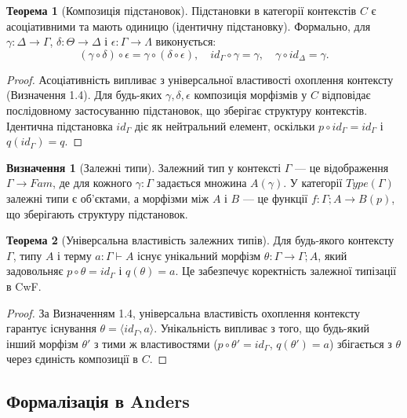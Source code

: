 \documentclass{article}
\theoremstyle{definition}
\newtheorem{definition}{Визначення}[section]
\newtheorem{theorem}{Теорема}[section]
\begin{document}
\begin{theorem}[Композиція підстановок]
Підстановки в категорії контекстів $C$ є асоціативними та мають одиницю (ідентичну підстановку). Формально, для $\gamma:\Delta\rightarrow\Gamma$, $\delta:\Theta\rightarrow\Delta$ і $\epsilon:\Gamma\rightarrow\Lambda$ виконується:
\[
    (\gamma \circ \delta) \circ \epsilon = \gamma \circ (\delta \circ \epsilon), \quad id_{\Gamma} \circ \gamma = \gamma, \quad \gamma \circ id_{\Delta} = \gamma.
\]
\end{theorem}

\begin{proof}
Асоціативність випливає з універсальної властивості охоплення контексту (Визначення 1.4). Для будь-яких $\gamma,\delta,\epsilon$ композиція морфізмів у $C$ відповідає послідовному застосуванню підстановок, що зберігає структуру контекстів. Ідентична підстановка $id_{\Gamma}$ діє як нейтральний елемент, оскільки $p \circ id_{\Gamma} = id_{\Gamma}$ і $q(id_{\Gamma}) = q$.
\end{proof}

\begin{definition}[Залежні типи]
Залежний тип у контексті $\Gamma$ --- це відображення $\Gamma \rightarrow Fam$, де для кожного $\gamma:\Gamma$ задається множина $A(\gamma)$. У категорії $Type(\Gamma)$ залежні типи є об’єктами, а морфізми між $A$ і $B$ --- це функції $f: \Gamma;A \rightarrow B(p)$, що зберігають структуру підстановок.
\end{definition}

\begin{theorem}[Універсальна властивість залежних типів]
Для будь-якого контексту $\Gamma$, типу $A$ і терму $a:\Gamma\vdash A$ існує унікальний морфізм $\theta:\Gamma \rightarrow \Gamma;A$, який задовольняє $p \circ \theta = id_{\Gamma}$ і $q(\theta) = a$. Це забезпечує коректність залежної типізації в CwF.
\end{theorem}

\begin{proof}
За Визначенням 1.4, універсальна властивість охоплення контексту гарантує існування $\theta = \langle id_{\Gamma}, a \rangle$. Унікальність випливає з того, що будь-який інший морфізм $\theta'$ з тими ж властивостями ($p \circ \theta' = id_{\Gamma}$, $q(\theta') = a$) збігається з $\theta$ через єдиність композиції в $C$.
\end{proof}

\subsection{Формалізація в Anders}
\end{document}
